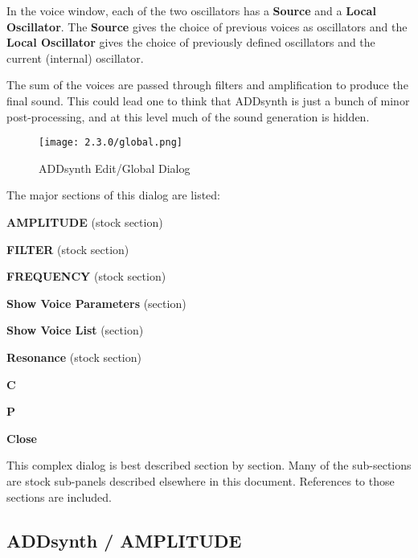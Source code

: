   In the voice window, each of the two oscillators has a \textbf{Source} and a
   \textbf{Local Oscillator}. The \textbf{Source} gives the choice of previous
   voices as oscillators and the \textbf{Local Oscillator} gives the choice
   of previously defined oscillators and the current (internal) oscillator.

   The sum of the voices are passed through filters and amplification to
   produce the final sound. This could lead one to think that ADDsynth is just
   a bunch of minor post-processing, and at this level much of the sound
   generation is hidden.

\begin{figure}[H]
   \centering
   \texttt{[image: 2.3.0/global.png]}
   \caption{ADDsynth Edit/Global Dialog}
   \label{fig:addsynth_edit_dialog}
\end{figure}

   The major sections of this dialog are listed:

   \begin{enumber}
      \item \textbf{AMPLITUDE} (stock section)
      \item \textbf{FILTER} (stock section)
      \item \textbf{FREQUENCY} (stock section)
      \item \textbf{Show Voice Parameters} (section)
      \item \textbf{Show Voice List} (section)
      \item \textbf{Resonance} (stock section)
      \item \textbf{C}
      \item \textbf{P}
      \item \textbf{Close}
   \end{enumber}

   This complex dialog is best described section by section.
   Many of the sub-sections are stock sub-panels described elsewhere
   in this document.  References to those sections are included.

\subsection{ADDsynth / AMPLITUDE}
\label{subsec:addsynth_amplitude}


